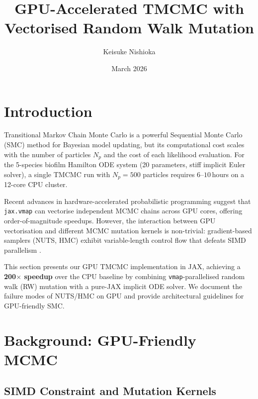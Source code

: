 \documentclass[11pt,a4paper]{article}
\title{GPU-Accelerated TMCMC with Vectorised Random Walk Mutation}
\author{Keisuke Nishioka}
\date{March 2026}
\begin{document}
\maketitle

\section{Introduction}
\label{sec:gpu_intro}

Transitional Markov Chain Monte Carlo \cite{Ching2007} is a powerful
Sequential Monte Carlo (SMC) method for Bayesian model updating, but its
computational cost scales with the number of particles $N_p$ and the cost of
each likelihood evaluation.  For the 5-species biofilm Hamilton ODE system
(20 parameters, stiff implicit Euler solver), a single TMCMC run with
$N_p = 500$ particles requires $6$--$10$\,hours on a 12-core CPU cluster.

Recent advances in hardware-accelerated probabilistic programming
\cite{Lao2020,Sountsov2024,Cabezas2024} suggest that \texttt{jax.vmap}
can vectorise independent MCMC chains across GPU cores, offering
order-of-magnitude speedups.  However, the interaction between GPU
vectorisation and different MCMC mutation kernels is non-trivial:
gradient-based samplers (NUTS, HMC) exhibit variable-length control flow
that defeats SIMD parallelism \cite{Dance2025}.

This section presents our GPU TMCMC implementation in JAX, achieving a
\textbf{200$\times$ speedup} over the CPU baseline by combining
\texttt{vmap}-parallelised random walk (RW) mutation with a pure-JAX
implicit ODE solver.  We document the failure modes of NUTS/HMC on GPU
and provide architectural guidelines for GPU-friendly SMC.


\section{Background: GPU-Friendly MCMC}
\label{sec:gpu_background}

\subsection{SIMD Constraint and Mutation Kernels}
\end{document}
